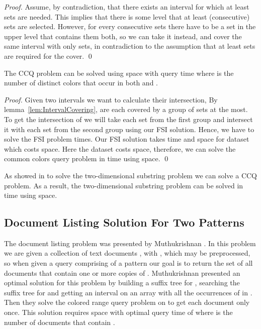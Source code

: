 \documentclass[10pt]{llncs}
\begin{document}
\begin{proof}
Assume, by contradiction, that there exists an interval for which at least  sets are needed.
This implies that there is some level that at least  (consecutive) sets are selected.
However, for every  consecutive sets there have to be a set in the upper level
that contains them both, so we can take it instead,
and cover the same interval with only  sets,
in contradiction to the assumption that at least  sets are required for the cover.
\qed
\end{proof}

\begin{theorem}\label{thm:CCQByFSI}
The CCQ problem can be solved
using  space with  query time
where  is the number of distinct colors that occur in both  and .
\end{theorem}
\begin{proof}
Given two intervals  we want to calculate their intersection,
By lemma~\ref{lem:IntervalCovering},  are each covered by a group of  sets at the most.
To get the intersection of  we will take each set from the first group
and intersect it with each set from the second group using our FSI solution.
Hence, we have to solve the FSI problem  times.
Our FSI solution takes  time and  space for dataset which costs  space.
Here the dataset costs  space,
therefore, we can solve the common colors query problem
in  time using  space.
\qed
\end{proof}

As showed in \cite{Muthu01} to solve the two-dimensional substring problem we can solve a CCQ problem.
As a result, the two-dimensional substring problem can be solved
in  time using  space.

\subsection{Document Listing Solution For Two Patterns}
The document listing problem was presented by Muthukrishnan \cite{Muthu02}.
In this problem we are given a collection  of text documents ,
with , which may be preprocessed,
so when given a query comprising of a pattern 
our goal is to return the set of all documents that contain one or more copies of .
Muthukrishnan presented an optimal solution for this problem by building a suffix tree for ,
searching the suffix tree for  and getting an interval  on an array with all the occurrences of  in .
Then they solve the colored range query problem on  to get each document only once.
This solution requires  space with optimal query time of 
where  is the number of documents that contain .
\end{document}
